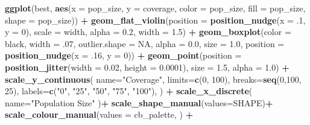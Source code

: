 \documentclass[
]{book}
\newenvironment{Shaded}{\begin{snugshade}}{\end{snugshade}}
\newcommand{\AttributeTok}[1]{\textcolor[rgb]{0.13,0.29,0.53}{#1}}
\newcommand{\ConstantTok}[1]{\textcolor[rgb]{0.56,0.35,0.01}{#1}}
\newcommand{\DecValTok}[1]{\textcolor[rgb]{0.00,0.00,0.81}{#1}}
\newcommand{\FloatTok}[1]{\textcolor[rgb]{0.00,0.00,0.81}{#1}}
\newcommand{\FunctionTok}[1]{\textcolor[rgb]{0.13,0.29,0.53}{\textbf{#1}}}
\newcommand{\NormalTok}[1]{#1}
\newcommand{\SpecialCharTok}[1]{\textcolor[rgb]{0.81,0.36,0.00}{\textbf{#1}}}
\newcommand{\StringTok}[1]{\textcolor[rgb]{0.31,0.60,0.02}{#1}}
\begin{document}
\begin{Shaded}
\begin{Highlighting}[]
\FunctionTok{ggplot}\NormalTok{(best, }\FunctionTok{aes}\NormalTok{(}\AttributeTok{x =}\NormalTok{ pop\_size, }\AttributeTok{y =}\NormalTok{ coverage, }\AttributeTok{color =}\NormalTok{ pop\_size, }\AttributeTok{fill =}\NormalTok{ pop\_size, }\AttributeTok{shape =}\NormalTok{ pop\_size)) }\SpecialCharTok{+}
  \FunctionTok{geom\_flat\_violin}\NormalTok{(}\AttributeTok{position =} \FunctionTok{position\_nudge}\NormalTok{(}\AttributeTok{x =}\NormalTok{ .}\DecValTok{1}\NormalTok{, }\AttributeTok{y =} \DecValTok{0}\NormalTok{), }\AttributeTok{scale =} \StringTok{\textquotesingle{}width\textquotesingle{}}\NormalTok{, }\AttributeTok{alpha =} \FloatTok{0.2}\NormalTok{, }\AttributeTok{width =} \FloatTok{1.5}\NormalTok{) }\SpecialCharTok{+}
  \FunctionTok{geom\_boxplot}\NormalTok{(}\AttributeTok{color =} \StringTok{\textquotesingle{}black\textquotesingle{}}\NormalTok{, }\AttributeTok{width =}\NormalTok{ .}\DecValTok{07}\NormalTok{, }\AttributeTok{outlier.shape =} \ConstantTok{NA}\NormalTok{, }\AttributeTok{alpha =} \FloatTok{0.0}\NormalTok{, }\AttributeTok{size =} \FloatTok{1.0}\NormalTok{, }\AttributeTok{position =} \FunctionTok{position\_nudge}\NormalTok{(}\AttributeTok{x =}\NormalTok{ .}\DecValTok{16}\NormalTok{, }\AttributeTok{y =} \DecValTok{0}\NormalTok{)) }\SpecialCharTok{+}
  \FunctionTok{geom\_point}\NormalTok{(}\AttributeTok{position =} \FunctionTok{position\_jitter}\NormalTok{(}\AttributeTok{width =} \FloatTok{0.02}\NormalTok{, }\AttributeTok{height =} \FloatTok{0.0001}\NormalTok{), }\AttributeTok{size =} \FloatTok{1.5}\NormalTok{, }\AttributeTok{alpha =} \FloatTok{1.0}\NormalTok{) }\SpecialCharTok{+}
  \FunctionTok{scale\_y\_continuous}\NormalTok{(}
    \AttributeTok{name=}\StringTok{"Coverage"}\NormalTok{,}
    \AttributeTok{limits=}\FunctionTok{c}\NormalTok{(}\DecValTok{0}\NormalTok{, }\DecValTok{100}\NormalTok{),}
    \AttributeTok{breaks=}\FunctionTok{seq}\NormalTok{(}\DecValTok{0}\NormalTok{,}\DecValTok{100}\NormalTok{, }\DecValTok{25}\NormalTok{),}
    \AttributeTok{labels=}\FunctionTok{c}\NormalTok{(}\StringTok{"0"}\NormalTok{, }\StringTok{"25"}\NormalTok{, }\StringTok{"50"}\NormalTok{, }\StringTok{"75"}\NormalTok{, }\StringTok{"100"}\NormalTok{),}
\NormalTok{  ) }\SpecialCharTok{+}
  \FunctionTok{scale\_x\_discrete}\NormalTok{(}
    \AttributeTok{name=}\StringTok{"Population Size"}
\NormalTok{  )}\SpecialCharTok{+}
  \FunctionTok{scale\_shape\_manual}\NormalTok{(}\AttributeTok{values=}\NormalTok{SHAPE)}\SpecialCharTok{+}
  \FunctionTok{scale\_colour\_manual}\NormalTok{(}\AttributeTok{values =}\NormalTok{ cb\_palette, ) }\SpecialCharTok{+}

\end{Highlighting}
\end{Shaded}
\end{document}
